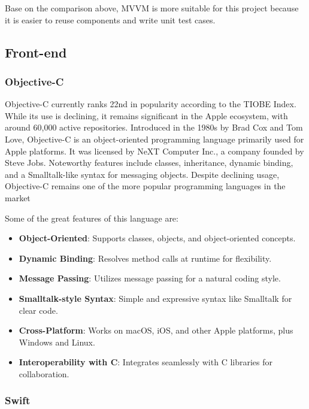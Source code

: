 Base on the comparison above, MVVM is more suitable for this project because it is easier to reuse components and write unit test cases.

\subsection{Front-end}

\subsubsection{Objective-C}

Objective-C currently ranks 22nd in popularity according to the TIOBE Index. While its use is declining, it remains significant in the Apple ecosystem, with around 60,000 active repositories. Introduced in the 1980s by Brad Cox and Tom Love, Objective-C is an object-oriented programming language primarily used for Apple platforms. It was licensed by NeXT Computer Inc., a company founded by Steve Jobs. Noteworthy features include classes, inheritance, dynamic binding, and a Smalltalk-like syntax for messaging objects. Despite declining usage, Objective-C remains one of the more popular programming languages in the market

Some of the great features of this language are:

\begin{itemize}
    \item \textbf{Object-Oriented}: Supports classes, objects, and object-oriented concepts.
    \item \textbf{Dynamic Binding}: Resolves method calls at runtime for flexibility.
    \item \textbf{Message Passing}: Utilizes message passing for a natural coding style.
    \item \textbf{Smalltalk-style Syntax}: Simple and expressive syntax like Smalltalk for clear code.
    \item \textbf{Cross-Platform}: Works on macOS, iOS, and other Apple platforms, plus Windows and Linux.
    \item \textbf{Interoperability with C}: Integrates seamlessly with C libraries for collaboration.
\end{itemize}

\subsubsection{Swift}


